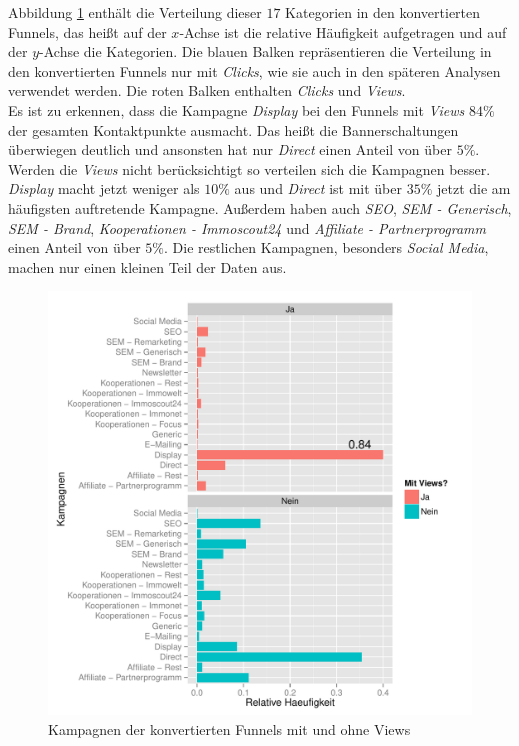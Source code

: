 Abbildung \ref{campaignSucc} enthält die Verteilung dieser $17$ Kategorien in den konvertierten Funnels, das heißt auf der $x$-Achse ist die relative Häufigkeit aufgetragen und auf der $y$-Achse die Kategorien. Die blauen Balken repräsentieren die Verteilung in den konvertierten Funnels nur mit \textit{Clicks}, wie sie auch in den späteren Analysen verwendet werden. Die roten Balken enthalten \textit{Clicks} und \textit{Views}.\\
Es ist zu erkennen, dass die Kampagne \textit{Display} bei den Funnels mit \textit{Views} $84 \%$ der gesamten Kontaktpunkte ausmacht. Das heißt die Bannerschaltungen überwiegen deutlich und ansonsten hat nur \textit{Direct} einen Anteil von über $5 \%$.\\
Werden die \textit{Views} nicht berücksichtigt so verteilen sich die Kampagnen besser. \textit{Display} macht jetzt weniger als $10 \%$ aus und \textit{Direct} ist mit über $35 \%$ jetzt die am häufigsten auftretende Kampagne. Außerdem haben auch \textit{SEO}, \textit{SEM - Generisch}, \textit{SEM - Brand}, \textit{Kooperationen - Immoscout24} und \textit{Affiliate - Partnerprogramm} einen Anteil von über $5 \%$. Die restlichen Kampagnen, besonders \textit{Social Media}, machen nur einen kleinen Teil der Daten aus.
\begin{figure}[H]
    \centering
    \includegraphics[scale=0.5]{campaignSucc.pdf}
    \caption{Kampagnen der konvertierten Funnels mit und ohne Views}
    \label{campaignSucc}
\end{figure}

